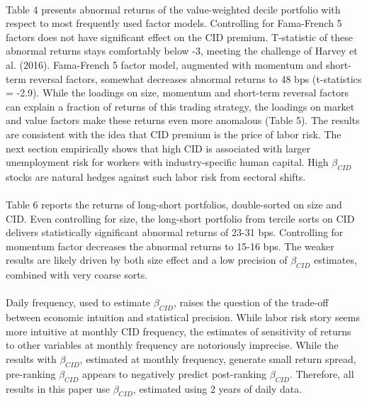 \documentclass[12pt]{article}
\begin{document}
\paragraph{}
Table 4 presents abnormal returns of the value-weighted decile portfolio with respect to most frequently used factor models. Controlling for Fama-French 5 factors does not have significant effect on the CID premium. T-statistic of these abnormal returns stays comfortably below -3, meeting the challenge of Harvey et al. (2016). Fama-French 5 factor model, augmented with momentum and short-term reversal factors, somewhat decreases abnormal returns to 48 bps (t-statistics = -2.9). While the loadings on size, momentum and short-term reversal factors can explain a fraction of returns of this trading strategy, the loadings on market and value factors make these returns even more anomalous (Table 5). The results are consistent with the idea that CID premium is the price of labor risk. The next section empirically shows that high CID is associated with larger unemployment risk for workers with industry-specific human capital. High $\beta_{CID}$ stocks are natural hedges against such labor risk from sectoral shifts.
\paragraph{}
Table 6 reports the returns of long-short portfolios, double-sorted on size and CID. Even controlling for size, the long-short portfolio from tercile sorts on CID delivers statistically significant abnormal returns of 23-31 bps. Controlling for momentum factor decreases the abnormal returns to 15-16 bps. The weaker results are likely driven by both size effect and a low precision of $\beta_{CID}$ estimates, combined with very coarse sorts.
\paragraph{}
Daily frequency, used to estimate $\beta_{CID}$, raises the question of the trade-off between economic intuition and statistical precision. While labor risk story seems more intuitive at monthly CID frequency, the estimates of sensitivity of returns to other variables at monthly frequency are notoriously imprecise. While the results with $\beta_{CID}$, estimated at monthly frequency, generate small return spread, pre-ranking $\beta_{CID}$ appears to negatively predict post-ranking $\beta_{CID}$. Therefore, all results in this paper use $\beta_{CID}$, estimated using 2 years of daily data.
\end{document}
